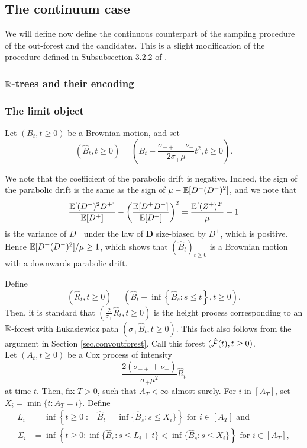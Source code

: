 \subsection{The continuum case}\label{subsec.limitobject}
We will define now define the continuous counterpart of the sampling procedure of the out-forest and the candidates. This is a slight modification of the procedure defined in Subsubsection 3.2.2 of \cite{Goldschmidt2019}. \\

\subsubsection{\texorpdfstring{${\mathbb R}$}{R}-trees and their encoding}


\subsubsection{The limit object}\label{subsubsec.samplecontinuousobject}
Let $(B_t,t\geq 0)$ be a Brownian motion, and set $$\left(\hat{B}_t,t\geq 0\right)=\left(B_t-\frac{\sigma_{-+}+\nu_-}{2\sigma_+\mu}t^2,t\geq 0\right).$$ 
\begin{remark}
We note that the coefficient of the parabolic drift is negative. Indeed, the sign of the parabolic drift is the same as the sign of $\mu-{\mathbb E}[D^+(D^-)^2]$, and we note that
$$\frac{{\mathbb E}[(D^-)^2D^+]}{{\mathbb E}[D^+]}-\left(\frac{{\mathbb E}[D^+D^-]}{{\mathbb E}[D^+]}\right)^2=\frac{{\mathbb E}[(Z^+)^2]}{\mu}-1$$
is the variance of $D^-$ under the law of $\mathbf{D}$ size-biased by $D^+$, which is positive. Hence ${\mathbb E}[D^+(D^-)^2]/\mu\geq 1$, which shows that $(\hat{B}_t)_{t\geq 0}$ is a Brownian motion with a downwards parabolic drift.
\end{remark}
Define 
$$(\hat{R}_t,t\geq 0)= \left(\hat{B}_t-\inf\left\{\hat{B}_s: s\leq t\right\},t\geq 0\right).$$
Then, it is standard that $\left(\frac{2}{\sigma_+}\hat{R}_t,t\geq 0\right)$ is the height process corresponding to an ${\mathbb R}$-forest with \L ukasiewicz path $\left(\sigma_+\hat{B}_t,t\geq 0\right)$.  This fact also follows from the argument in Section \ref{sec.convoutforest}. Call this forest $(\hat{{\mathcal F}}(t),t\geq 0)$. \\
Let $(A_t,t\geq 0)$ be a Cox process of intensity $$\frac{2(\sigma_{-+}+\nu_-)}{\sigma_+\mu^2} \hat{R}_t$$ at time $t$. Then, fix $T>0$, such that $A_T<\infty$ almost surely. For $i$ in $\left[A_T\right]$, set $X_i=\min\{t:A_T=i\}$. Define
\begin{align*}
L_i&=\inf\left\{t\geq 0:=\hat{B}_t=\inf\{\hat{B}_s:s\leq X_i\}\right\}\text{ for }i\in \left[A_T\right]\text{ and}\\
\Sigma_i&=\inf\left\{ t\geq 0: \inf\{\hat{B}_s:s\leq L_i+t\} < \inf\{\hat{B}_s:s\leq X_i\}\right\}\text{ for }i\in \left[A_T\right],
\end{align*}
